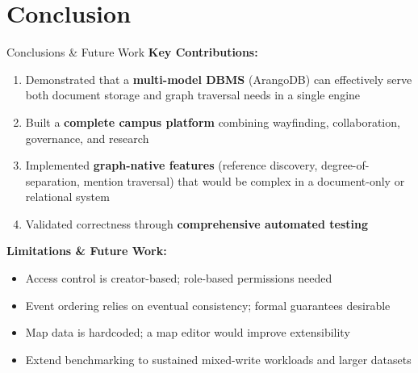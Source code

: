 \documentclass[aspectratio=169,11pt]{beamer}
\begin{document}
\section{Conclusion}

\begin{frame}{Conclusions \& Future Work}
  \textbf{Key Contributions:}
  \begin{enumerate}
    \item Demonstrated that a \textbf{multi-model DBMS} (ArangoDB) can effectively
          serve both document storage and graph traversal needs in a single engine
    \item Built a \textbf{complete campus platform} combining wayfinding,
          collaboration, governance, and research
    \item Implemented \textbf{graph-native features} (reference discovery,
          degree-of-separation, mention traversal) that would be complex
          in a document-only or relational system
    \item Validated correctness through \textbf{comprehensive automated testing}
  \end{enumerate}
  \vspace{0.5em}
  \textbf{Limitations \& Future Work:}
  \begin{itemize}
    \item Access control is creator-based; role-based permissions needed
    \item Event ordering relies on eventual consistency; formal guarantees desirable
    \item Map data is hardcoded; a map editor would improve extensibility
    \item Extend benchmarking to sustained mixed-write workloads and larger datasets
  \end{itemize}
\end{frame}
\end{document}
